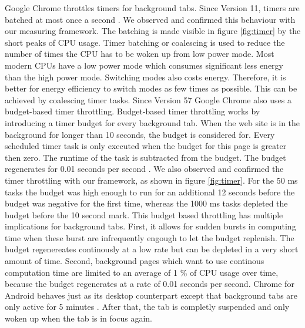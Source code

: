 \documentclass[
	ruledheaders=section,%
	class=report,%
	thesis={type=bachelor},%
	accentcolor=9c,%
	custommargins=true,%
	marginpar=false,%
	parskip=half-,%
	fontsize=11pt,%
]{tudapub}
\begin{document}
  Google Chrome throttles timers for background tabs. Since Version 11, timers are batched at most once a second \cite{chrome-background-tabs}. We observed and confirmed this behaviour with our measuring framework. The batching is made visible in figure \ref{fig:timer} by the short peaks of CPU usage. Timer batching or coalescing is used to reduce the number of times the CPU has to be woken up from low power mode. Most modern CPUs have a low power mode which consumes significant less energy than the high power mode. Switching modes also costs energy. Therefore, it is better for energy efficiency to switch modes as few times as possible. This can be achieved by coalescing timer tasks. Since Version 57 Google Chrome also uses a budget-based timer throttling. Budget-based timer throttling works by introducing a timer budget for every background tab. When the web site is in the background for longer than 10 seconds, the budget is considered for. Every scheduled timer task is only executed when the budget for this page is greater then zero. The runtime of the task is subtracted from the budget. The budget regenerates for 0.01 seconds per second \cite{chrome-background-tabs}. We also observed and confirmed the timer throttling with our framework, as shown in figure \ref{fig:timer}. For the 50 ms tasks the budget was high enough to run for an additional 12 seconds before the budget was negative for the first time, whereas the 1000 ms tasks depleted the budget before the 10 second mark. This budget based throttling has multiple implications for background tabs. First, it allows for sudden bursts in computing time when these burst are infrequently engough to let the budget replenish. The budget regenereates continously at a low rate but can be depleted in a very short amount of time. Second, background pages which want to use continous computation time are limited to an average of 1 \% of CPU usage over time, because the budget regenerates at a rate of 0.01 seconds per second. Chrome for Android behaves just as its desktop counterpart except that background tabs are only active for 5 minutes \cite{chrome-android-suspend}. After that, the tab is completly suspended and only woken up when the tab is in focus again.
\end{document}
